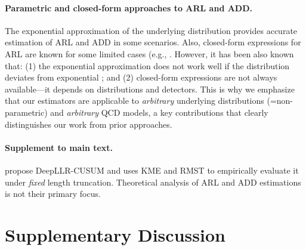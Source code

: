 \documentclass{article}
\theoremstyle{plain}
\theoremstyle{definition}
\theoremstyle{remark}
\begin{document}
\paragraph{Parametric and closed-form approaches to ARL and ADD.}
The exponential approximation of the underlying distribution provides accurate estimation of ARL and ADD in some scenarios. 
Also, closed-form expressions for ARL are known for some limited cases (e.g., \citep{fu2002average, areepong2022integral, sunthornwat2023analytical}.
However, it has been also known that:
(1) the exponential approximation does not work well if the distribution deviates from exponential \citep{borror2003robustness, pehlivan2010impact}; 
and (2) closed-form expressions are not always available—it depends on distributions and detectors.
This is why we emphasize that our estimators are applicable to \textit{arbitrary} underlying distributions (=non-parametric) and \textit{arbitrary} QCD models, a key contributions that clearly distinguishes our work from prior approaches.


\paragraph{Supplement to main text.}
\citet{ahmed2025deepllrcusum} propose DeepLLR-CUSUM and uses KME and RMST to empirically evaluate it under \textit{fixed} length truncation.
Theoretical analysis of ARL and ADD estimations is not their primary focus.









\section{Supplementary Discussion} \label{app:Supplementary Discussions}
\end{document}
